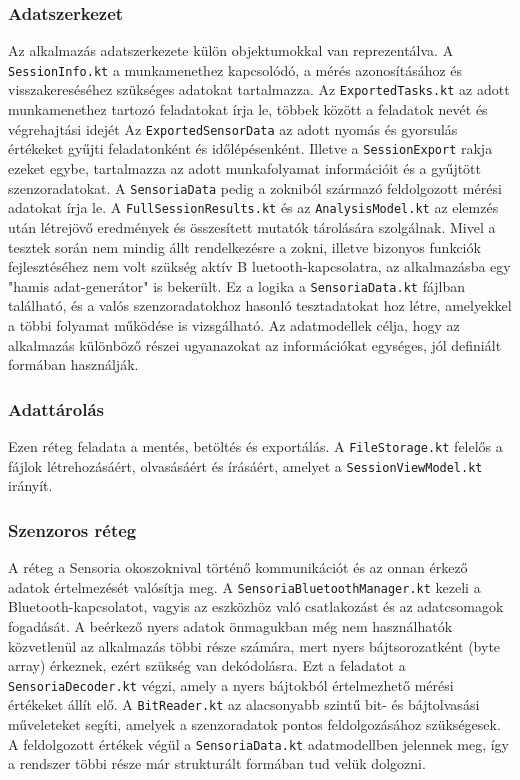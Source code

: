 \subsubsection{Adatszerkezet}

Az alkalmazás adatszerkezete külön objektumokkal van reprezentálva. A \texttt{SessionInfo.kt} a
munkamenethez kapcsolódó, a mérés azonosításához és visszakereséséhez
szükséges adatokat tartalmazza. Az \texttt{ExportedTasks.kt} az adott munkamenethez tartozó feladatokat
írja le, többek között a feladatok nevét és végrehajtási idejét
Az \texttt{ExportedSensorData} az adott nyomás és gyorsulás értékeket
gyűjti feladatonként és időlépésenként. Illetve a \texttt{SessionExport} rakja ezeket egybe,
tartalmazza az adott munkafolyamat információit és a gyűjtött szenzoradatokat. A
\texttt{SensoriaData} pedig a zokniból származó feldolgozott mérési adatokat írja le.
A \texttt{FullSessionResults.kt} és az \texttt{AnalysisModel.kt} az elemzés után létrejövő
eredmények és összesített mutatók tárolására szolgálnak. Mivel a tesztek során nem mindig állt
rendelkezésre a zokni, illetve bizonyos funkciók fejlesztéséhez nem volt szükség aktív B
luetooth-kapcsolatra, az alkalmazásba egy "hamis adat-generátor" is bekerült.
Ez a logika a \texttt{SensoriaData.kt} fájlban található, és a valós szenzoradatokhoz hasonló
tesztadatokat hoz létre, amelyekkel a többi folyamat működése is vizsgálható.
Az adatmodellek célja, hogy az alkalmazás különböző részei ugyanazokat az információkat egységes,
jól definiált formában használják.

\subsubsection{Adattárolás}

Ezen réteg feladata a mentés, betöltés és exportálás. A \texttt{FileStorage.kt} felelős a fájlok
létrehozásáért, olvasásáért és írásáért, amelyet a \texttt{SessionViewModel.kt} irányít.

\subsubsection{Szenzoros réteg}

A réteg a Sensoria okoszoknival történő kommunikációt és az onnan érkező adatok értelmezését
valósítja meg. A \texttt{SensoriaBluetoothManager.kt} kezeli a Bluetooth-kapcsolatot, vagyis az
eszközhöz való csatlakozást és az adatcsomagok fogadását. A beérkező nyers adatok önmagukban még
nem használhatók közvetlenül az alkalmazás többi része számára, mert nyers bájtsorozatként (byte array)
érkeznek, ezért szükség van dekódolásra. Ezt a feladatot a \texttt{SensoriaDecoder.kt} végzi, amely a nyers
bájtokból értelmezhető mérési értékeket állít elő. A \texttt{BitReader.kt} az alacsonyabb szintű
bit- és bájtolvasási műveleteket segíti, amelyek a szenzoradatok pontos feldolgozásához szükségesek.
A feldolgozott értékek végül a \texttt{SensoriaData.kt} adatmodellben jelennek meg, így a rendszer többi része
már strukturált formában tud velük dolgozni.

